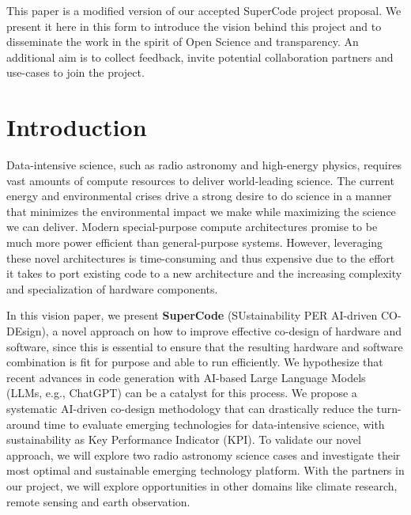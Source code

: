 \documentclass[a4wide,twocolumn]{article}
\begin{document}
This paper is a modified version of our accepted SuperCode project proposal. We present it here in this form to introduce the vision behind this project and to disseminate the work in the spirit of Open Science and transparency. An additional aim is to collect feedback, invite potential collaboration partners and use-cases to join the project.

\section{Introduction}
Data-intensive science, such as radio astronomy and high-energy physics, requires vast amounts of compute resources to deliver world-leading science. The current energy and environmental crises drive a strong desire to do science in a manner that minimizes the environmental impact we make while maximizing the science we can deliver. Modern special-purpose compute architectures promise to be much more power efficient than general-purpose systems. However, leveraging these novel architectures is time-consuming and thus expensive due to the effort it takes to port existing code to a new architecture and the increasing complexity and specialization of hardware components. 

In this vision paper, we present \textbf{SuperCode} (SUstainability PER AI-driven CO-DEsign), a novel approach on how to improve effective co-design of hardware and software, since this is essential to ensure that the resulting hardware and software combination is fit for purpose and able to run efficiently. We hypothesize that recent advances in code generation with AI-based Large Language Models (LLMs, e.g., ChatGPT) can be a catalyst for this process. We propose a systematic AI-driven co-design methodology that can drastically reduce the turn-around time to evaluate emerging technologies for data-intensive science, with sustainability as Key Performance Indicator (KPI). To validate our novel approach, we will explore two radio astronomy science cases and investigate their most optimal and sustainable emerging technology platform. With the partners in our project, we will explore opportunities in other domains like climate research, remote sensing and earth observation.
\end{document}
